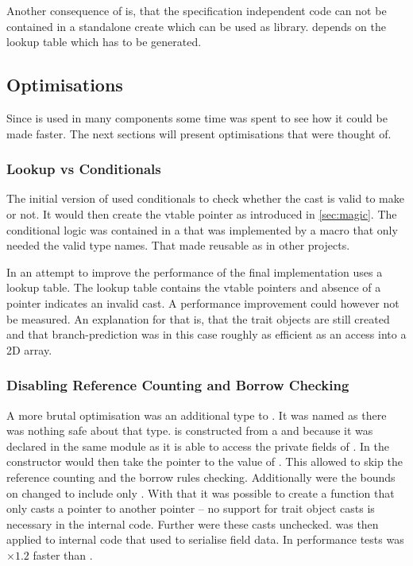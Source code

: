\documentclass[thesis]{subfiles}
\begin{document}
    Another consequence of \PtrT is, that the specification independent code can not be contained in a standalone create which can be used as library.
    \PtrT depends on the lookup table which has to be generated.

  \subsection{Optimisations}
    Since \PtrT is used in many components some time was spent to see how it could be made faster.
    The next sections will present optimisations that were thought of.

    \subsubsection{Lookup vs Conditionals}
      The initial version of \PtrT used conditionals to check whether the cast is valid to make or not.
      It would then create the vtable pointer as introduced in \autoref{sec:magic}.
      The conditional logic was contained in a \trait that was implemented by a macro that only needed the valid type names.
      That made \PtrT reusable as in other projects.

      In an attempt to improve the performance of \cast the final implementation uses a lookup table.
      The lookup table contains the vtable pointers and absence of a pointer indicates an invalid cast.
      A performance improvement could however not be measured.
      An explanation for that is, that the trait objects are still created and that branch-prediction was in this case roughly as efficient as an access into a 2D array.

    \subsubsection{Disabling Reference Counting and Borrow Checking}
      A more brutal optimisation was an additional type to \PtrT.
      It was named \HazardPtrT as there was nothing safe about that type.
      \HazardPtrT is constructed from a \PtrT and because it was declared in the same module as \PtrT it is able to access the private fields of \PtrT.
      In the constructor \HazardPtrT would then take the pointer to the value of \PtrT.
      This allowed to skip the reference counting and the borrow rules checking.
      Additionally were the bounds on \HazardPtrT changed to include only \structs.
      With that it was possible to create a \cast function that only casts a pointer to another pointer -- no support for trait object casts is necessary in the internal code.
      Further were these casts unchecked.
      \HazardPtrT was then applied to internal code that used \PtrT to serialise field data.
      In performance tests \HazardPtrT was $\times 1.2$ faster than \PtrT.
\end{document}
